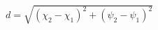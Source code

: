 \documentclass[amsart]{article}
\begin{document}
$d=\sqrt{(\chi_2-\chi_1)^2+(\psi_2-\psi_1)^2}$
\end{document}

